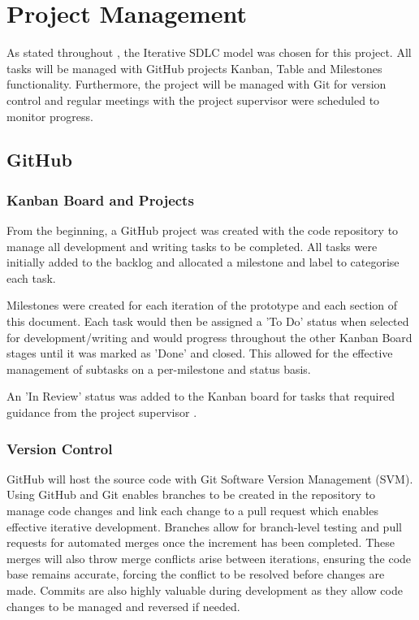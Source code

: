 \chapter{Project Management}
\label{chap:pm}

As stated throughout , the Iterative SDLC model was chosen for this project. All tasks will be managed with GitHub projects Kanban, Table and Milestones functionality. Furthermore, the project will be managed with Git for version control and regular meetings with the project supervisor were scheduled to monitor progress.

\section{GitHub}

\subsection{Kanban Board and Projects}
\label{pm:kanban}

From the beginning, a GitHub project was created with the code repository to manage all development and writing tasks to be completed. All tasks were initially added to the backlog and allocated a milestone and label to categorise each task.

Milestones were created for each iteration of the prototype and each section of this document. Each task would then be assigned a 'To Do' status when selected for development/writing and would progress throughout the other Kanban Board stages until it was marked as 'Done' and closed. This allowed for the effective management of subtasks on a per-milestone and status basis.

An 'In Review' status was added to the Kanban board for tasks that required guidance from the project supervisor .

\subsection{Version Control}
\label{pm:version_control}

GitHub will host the source code with Git Software Version Management (SVM). Using GitHub and Git enables branches to be created in the repository to manage code changes and link each change to a pull request which enables effective iterative development. Branches allow for branch-level testing and pull requests for automated merges once the increment has been completed. These merges will also throw merge conflicts arise between iterations, ensuring the code base remains accurate, forcing the conflict to be resolved before changes are made. Commits are also highly valuable during development as they allow code changes to be managed and reversed if needed. 

